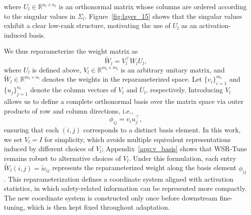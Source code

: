 \documentclass{article}
\newcommand{\djh}[1]{{\leavevmode\color{magenta}[DJ: #1]}}
\newcommand{\kms}[1]{{\leavevmode\color{blue}[MS: #1]}}
\begin{document}
where $U_l \in \mathbb{R}^{n_l \times n_l}$ is an orthonormal matrix whose columns are ordered according to the singular values in $\Sigma_l$. Figure~\ref{fig:layer_15} shows that the singular values exhibit a clear low-rank structure, motivating the use of $U_l$ as an activation-induced basis.







We thus reparameterize the weight matrix as 
\begin{equation} 
\widetilde{W}_l  = V_l^\top W_l U_l, 
\end{equation} 
where $U_l$ is defined above, $V_l \in \mathbb{R}^{m_l \times m_l}$ %
is an arbitrary unitary matrix, and $\widetilde{W}_l \in \mathbb{R}^{m_l \times n_l}$ denotes the weights in the reparameterized space. %
Let $\{v_i\}_{i=1}^{m_l}$ and $\{u_j\}_{j=1}^{n_l}$ denote the column vectors of $V_l$ and $U_l$, respectively.  
Introducing $V_l$ allows us to define a complete orthonormal basis over the matrix space via outer products of row and column directions, i.e., 
\begin{equation}
\phi_{ij} = v_i u_j^\top, 
\end{equation}
ensuring that each $(i,j)$ corresponds to a distinct basis element. In this work, we set $V_l=I$ for simplicity,  which avoids multiple equivalent representations induced by different choices of $V_l$; Appendix~\ref{app:v_basis} shows that WSR-Tune remains robust to alternative choices of $V_l$.
Under this formulation, each entry $\widetilde{W}_l(i,j)=\tilde{w}_{ij}$ represents the reparameterized weight along the basis element $\phi_{ij}$. This reparameterization defines a coordinate system aligned with activation statistics, in which safety-related information can be represented more compactly. The new coordinate system is constructed only once before downstream fine-tuning, which is then kept fixed throughout adaptation.
\end{document}
